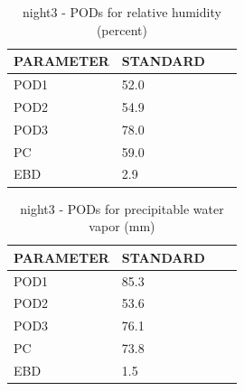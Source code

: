 \begin{table}[p!]
\begin{center}
\begin{tabular}{|l|l|l|l|}
\hline
\multicolumn{1}{|c|}{\cellcolor[HTML]{C0C0C0}\textbf{PARAMETER}} & \multicolumn{1}{c|}{\cellcolor[HTML]{C0C0C0}\textbf{STANDARD}} \\
\hline
\cellcolor[HTML]{C0C0C0}POD1  & 52.0                                \\
\cellcolor[HTML]{C0C0C0}POD2  & 54.9                                \\
\cellcolor[HTML]{C0C0C0}POD3  & 78.0                                \\
\cellcolor[HTML]{C0C0C0}PC    & 59.0                                  \\
\cellcolor[HTML]{C0C0C0}EBD   & 2.9                                 \\
\hline
\end{tabular}
\caption{night3 - PODs for relative humidity (percent)}
\label{tab:podrh:night3}
\end{center}
\end{table}
\begin{table}[p!]
\begin{center}
\begin{tabular}{|l|l|l|l|}
\hline
\multicolumn{1}{|c|}{\cellcolor[HTML]{C0C0C0}\textbf{PARAMETER}} & \multicolumn{1}{c|}{\cellcolor[HTML]{C0C0C0}\textbf{STANDARD}} \\
\hline
\cellcolor[HTML]{C0C0C0}POD1  & 85.3                                \\
\cellcolor[HTML]{C0C0C0}POD2  & 53.6                                \\
\cellcolor[HTML]{C0C0C0}POD3  & 76.1                                \\
\cellcolor[HTML]{C0C0C0}PC    & 73.8                                  \\
\cellcolor[HTML]{C0C0C0}EBD   & 1.5                                 \\
\hline
\end{tabular}
\caption{night3 - PODs for precipitable water vapor (mm)}
\label{tab:podpwv:night3}
\end{center}
\end{table}
